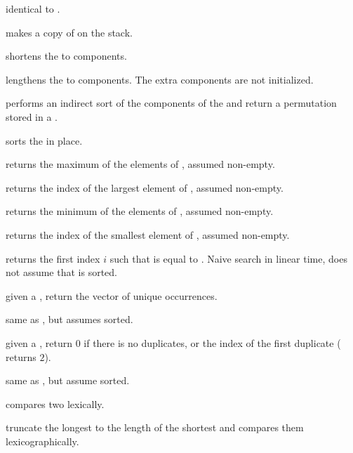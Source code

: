  identical to .

 makes a copy of  on the stack.

 shortens the  
to  components.

 lengthens the 
 to  components. The extra components are not initialized.

 performs an indirect sort of the
components of the   and return a permutation stored in a
.

 sorts the   in place.

 returns the maximum of the elements of
 , assumed non-empty.

 returns the index of the largest
element of  , assumed non-empty.

 returns the minimum of the elements of
 , assumed non-empty.

 returns the index of the smallest
element of  , assumed non-empty.

 returns the first index $i$
such that  is equal to . Naive search in linear time, does
not assume that  is sorted.

 given a  , return
the vector of unique occurrences.

 same as , but assumes
  sorted.

 given a  , return
$0$ if there is no duplicates, or the index of the first duplicate
( returns $2$).

 same as
, but assume  sorted.

 compares two  lexically.

 truncate the longest 
to the length of the shortest and compares them lexicographically.

